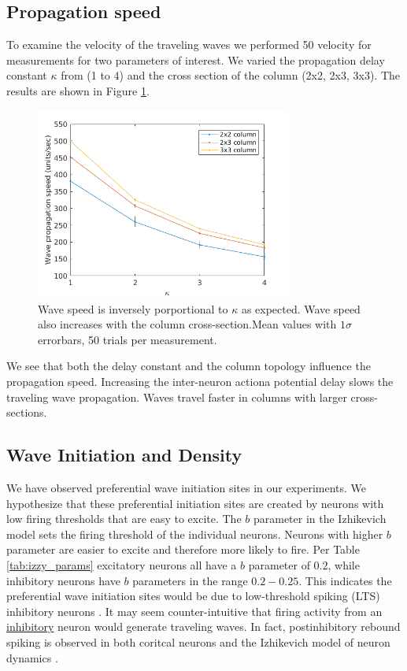 \documentclass[a4paper,11pt]{article}
\begin{document}
\subsection{Propagation speed} \label{sub:propagation_speed}
To examine the velocity of the traveling waves we performed 50 velocity for measurements for two parameters of interest.
We varied the propagation delay constant $\kappa$ from (1 to 4) and the cross section of the column (2x2, 2x3, 3x3).
The results are shown in Figure \ref{fig:delay_topology}.
\begin{figure}[!htb]
 \caption{Wave speed is inversely porportional to $\kappa$ as expected. Wave speed also increases with the column cross-section.Mean values with $1\sigma$ errorbars, 50 trials per measurement.}
 \label{fig:delay_topology}
 \centering
   \includegraphics[width=0.75\textwidth]{fig/WaveSpeed_DelayTopology}
\end{figure}

We see that both the delay constant and the column topology influence the propagation speed.
Increasing the inter-neuron actiona potential delay slows the traveling wave propagation.
Waves travel faster in columns with larger cross-sections. 

\subsection{Wave Initiation and Density} \label{sub:wave_initiation}
We have observed preferential wave initiation sites in our experiments.
We hypothesize that these preferential initiation sites are created by neurons with low firing thresholds that are easy to excite.
The $b$ parameter in the Izhikevich model sets the firing threshold of the individual neurons.
Neurons with higher $b$ parameter are easier to excite and therefore more likely to fire.
Per Table \ref{tab:izzy_params} excitatory neurons all have a $b$ parameter of $0.2$, while inhibitory neurons have $b$ parameters in the range $0.2-0.25$.
This indicates the preferential wave initiation sites would be due to low-threshold spiking (LTS) inhibitory neurons \cite{izhikevich2003}.
It may seem counter-intuitive that firing activity from an \underline{inhibitory} neuron would generate traveling waves.
In fact, postinhibitory rebound spiking is observed in both coritcal neurons \cite{ascoli2010} and the Izhikevich model of neuron dynamics \cite{izhikevich}.
\end{document}
